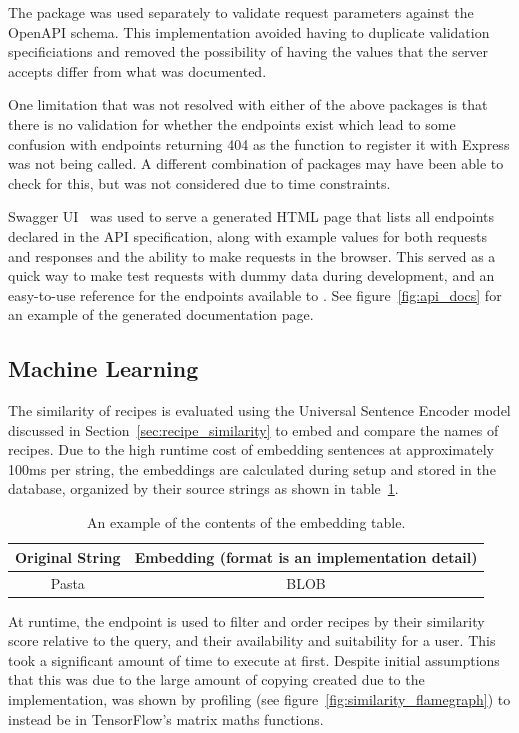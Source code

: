 The  package was used separately to validate
request parameters against the OpenAPI schema. This implementation avoided having
to duplicate validation specificiations and removed the possibility of having the values that
the server accepts differ from what was documented.

One limitation that was not resolved with either of the above packages is that there is no validation
for whether the endpoints exist which lead to some confusion with endpoints returning 404 as the function to
register it with Express was not being called. A different combination of packages may have been able to check for this,
but was not considered due to time constraints.

Swagger UI~\cite{smartbear_swagger_2024} was used to serve a generated HTML page that lists all endpoints declared in
the API specification, along with example values for both requests and responses and the ability to make requests in
the browser. This served as a quick way to make test requests with dummy data during development, and an easy-to-use
reference for the endpoints available to . See figure~\ref{fig:api_docs} for an example of the
generated documentation page.

\subsection{Machine Learning}
The similarity of recipes is evaluated using the Universal Sentence Encoder model discussed in Section~\ref{sec:recipe_similarity} to
embed and compare the names of recipes. Due to the high runtime cost of embedding sentences at approximately 100ms per string,
the embeddings are calculated during setup and stored in the database, organized by their source strings as shown in table~\ref{fig:embedding_table}.

\begin{table}[h]
    \centering
    \caption{\label{fig:embedding_table}An example of the contents of the embedding table.}
    \begin{tabular}{cc}
        \toprule
        \textbf{Original String} & \textbf{Embedding (format is an implementation detail)} \\\midrule
        Pasta & BLOB \\\bottomrule
    \end{tabular}
\end{table}

At runtime, the  endpoint is used to filter and order recipes by their similarity score
relative to the query, and their availability and suitability for a user.
This took a significant amount of time to execute at first. Despite initial assumptions that this was due to the large amount of copying
created due to the implementation, was shown by profiling (see figure~\ref{fig:similarity_flamegraph}) to instead be in TensorFlow's
matrix maths functions.

